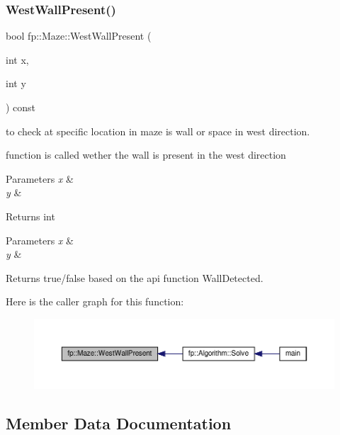 \subsubsection{\texorpdfstring{West\+Wall\+Present()}{WestWallPresent()}}
{\footnotesize\ttfamily bool fp\+::\+Maze\+::\+West\+Wall\+Present (\begin{DoxyParamCaption}\item[{int}]{x,  }\item[{int}]{y }\end{DoxyParamCaption}) const}



to check at specific location in maze is wall or space in west direction. 

function is called wether the wall is present in the west direction


\begin{DoxyParams}{Parameters}
{\em x} & \\
\hline
{\em y} & \\
\hline
\end{DoxyParams}
\begin{DoxyReturn}{Returns}
int
\end{DoxyReturn}

\begin{DoxyParams}{Parameters}
{\em x} & \\
\hline
{\em y} & \\
\hline
\end{DoxyParams}
\begin{DoxyReturn}{Returns}
true/false based on the api function Wall\+Detected. 
\end{DoxyReturn}
Here is the caller graph for this function\+:
\nopagebreak
\begin{figure}[H]
\begin{center}
\leavevmode
\includegraphics[width=350pt]{classfp_1_1_maze_a62c5692927ef95bafad2f0b7ae95a83e_icgraph}
\end{center}
\end{figure}


\subsection{Member Data Documentation}
\mbox{\label{classfp_1_1_maze_aaa20ddff203607af6ee3c95a00e2d2bf}} 
